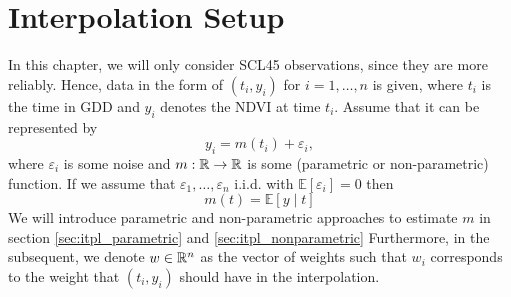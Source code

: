 \section{Interpolation Setup}{\label{sec:itpl_setup}
	In this chapter, we will only consider SCL45 observations, since they are more reliably. Hence, data in the form of $\left(t_{i}, y_{i}\right)$ for $i=1, \ldots, n$ is given, where $t_i$ is the time in GDD and $y_i$ denotes the NDVI at time $t_i$. Assume that it can be represented by
	$$
		y_{i}=m\left(t_{i}\right)+\varepsilon_{i},
	$$
	where $\varepsilon_i$ is some noise and $m: \mathbb{R} \rightarrow \mathbb{R}$ is some (parametric or non-parametric) function. If we assume that $\varepsilon_{1}, \ldots, \varepsilon_{n}$ i.i.d. with $\mathbb{E}\left[\varepsilon_{i}\right]=0$ then 
	$$
		m(t)=\mathbb{E}[y \mid t]
	$$
	We will introduce parametric and non-parametric approaches to estimate $m$ in section \ref{sec:itpl_parametric} and \ref{sec:itpl_nonparametric}
	Furthermore, in the subsequent, we denote $w\in \mathbb{R}^n$ as the vector of weights such that $w_i$ corresponds to the weight that $(t_i, y_i)$ should have in the interpolation. 
}








